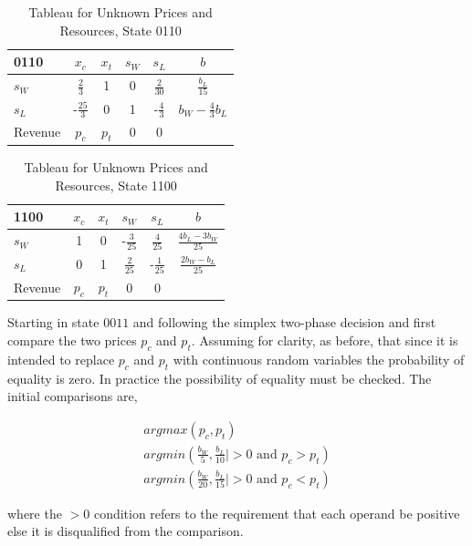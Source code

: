\begin{table}
\centering
\begin{tabular}{| l | c c c c | c |}
\hline
0110    & $x_c$ & $x_t$ & $s_W$ & $s_L$ & $b$\\
\hline
$s_W$   & $\frac{2}{3}$    & 1  & 0  & $\frac{2}{30}$  & $\frac{b_L}{15}$\\
$s_L$   & -$\frac{25}{3}$  & 0  & 1  & -$\frac{4}{3}$  & $b_W - \frac{4}{3}b_L$\\
\hline
Revenue & $p_c$    & $p_t$    & 0     & 0     &\\
\hline
\end{tabular}
  \caption[Tableau for Unknown Prices and Resources, State 0110]
          {Tableau for Unknown Prices and Resources, State 0110}
  \label{tab:pr0110}
\end{table}

\begin{table}
\centering
\begin{tabular}{| l | c c c c | c |}
\hline
1100    & $x_c$ & $x_t$ & $s_W$ & $s_L$ & $b$\\
\hline
$s_W$   & 1  & 0  & -$\frac{3}{25}$  & $\frac{4}{25}$  & $\frac{4b_L-3b_W}{25}$\\
$s_L$   & 0  & 1  & $\frac{2}{25}$  & -$\frac{1}{25}$  & $\frac{2b_W-b_L}{25}$\\
\hline
Revenue & $p_c$    & $p_t$    & 0     & 0     &\\
\hline
\end{tabular}
  \caption[Tableau for Unknown Prices and Resources, State 1100]
          {Tableau for Unknown Prices and Resources, State 1100}
  \label{tab:pr1100}
\end{table}

Starting in state $0011$ and following the simplex two-phase decision and first compare the two prices $p_c$ and $p_t$. Assuming for clarity, as before, that since it is intended to replace $p_c$ and $p_t$ with continuous random variables the probability of equality is zero. In practice the possibility of equality must be checked. The initial comparisons are,

\begin{align*}
argmax(p_c, p_t)\\
argmin(\frac{b_W}{5}, \frac{b_L}{10}  | > 0 \text{ and } p_c > p_t)\\
argmin(\frac{b_W}{20}, \frac{b_L}{15} | > 0 \text{ and } p_c < p_t)
\end{align*}

where the $> 0$ condition refers to the requirement that each operand be positive else it is disqualified from the comparison.

